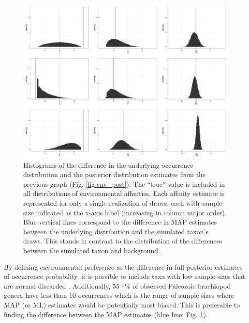 \documentclass[12pt,letterpaper]{article}
\begin{document}
\begin{figure}[ht]
  \centering
  \includegraphics[height = \textheight,width=\textwidth,keepaspectratio=true]{figure/env_diff}
  \caption{Histograms of the difference in the underlying occurrence distribution and the posterior distribution estimates from the previous graph (Fig. \ref{fig:env_post}). The ``true'' value is included in all distributions of environmental affinities. Each affinity estimate is represented for only a single realization of draws, each with sample size indicated as the x-axis label (increasing in column major order). Blue vertical lines correspond to the difference in MAP estimates between the underlying distribution and the simulated taxon's draws. This stands in contrast to the distribution of the differences between the simulated taxon and background.}
  \label{fig:env_diff}
\end{figure}

By defining environmental preference as the difference in full posterior estimates of occurrence probability, it is possible to include taxa with low sample sizes that are normal discarded \citep{Foote2006,Miller2001,Simpson2009,Kiessling2007a}. Additionally, 55+\% of observed Paleozoic brachiopod genera have less than 10 occurrences which is the range of sample sizes where MAP (or ML) estimates would be potentially most biased. This is preferable to finding the difference between the MAP estimates (blue line; Fig. \ref{fig:env_diff}).

\end{document}
